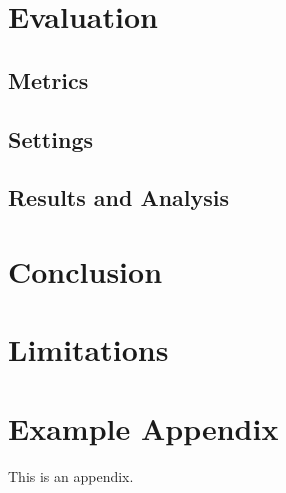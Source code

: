 \documentclass[11pt]{article}
\begin{document}

\section{Evaluation}

\subsection{Metrics}

\subsection{Settings}

\subsection{Results and Analysis}

\section{Conclusion}

\section*{Limitations}




\appendix

\section{Example Appendix}
\label{sec:appendix}

This is an appendix.
\end{document}
